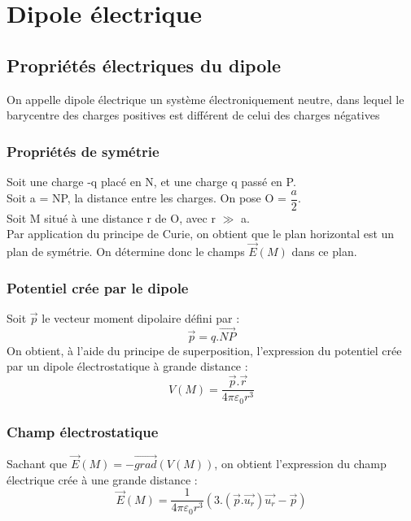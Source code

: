 \chapter{Dipole électrique}
\section{Propriétés électriques du dipole}
\begin{de}
On appelle dipole électrique un système électroniquement neutre, dans lequel le barycentre des charges positives est différent de celui des charges négatives
\end{de}
\subsection{Propriétés de symétrie}
Soit une charge -q placé en N, et une charge q passé en P.\\
Soit a = NP, la distance entre les charges. On pose O = $\dfrac{a}{2}$.\\
Soit M situé à une distance r de O, avec r $\gg$ a.\\
Par application du principe de Curie, on obtient que le plan horizontal est un plan de symétrie. On détermine donc le champs $\overrightarrow{E}(M)$ dans ce plan.
\subsection{Potentiel crée par le dipole}
Soit $\overrightarrow{p}$ le vecteur moment dipolaire défini par :
$$\overrightarrow{p} = q.\overrightarrow{NP}$$
On obtient, à l'aide du principe de superposition, l'expression du potentiel crée par un dipole électrostatique à grande distance : 
$$V(M) = \dfrac{\overrightarrow{p}.\overrightarrow{r}}{4\pi \varepsilon_0 r^3}$$
\subsection{Champ électrostatique}
Sachant que $\overrightarrow{E}(M) = -\overrightarrow{grad}(V(M))$, on obtient l'expression du champ électrique crée à une grande distance : 
$$\overrightarrow{E}(M) = \dfrac{1}{4\pi \varepsilon_0 r^3}(3.(\overrightarrow{p}.\overrightarrow{u_r})\overrightarrow{u_r}-\overrightarrow{p})$$
